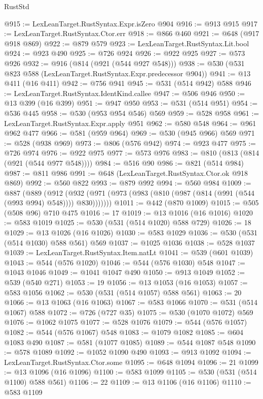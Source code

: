 \begin{lexlean}{RustStd}
\begin{coremodule}
{\begin{coremodule}
{{{{{{{{{{{{{{@915 := LexLeanTarget.RustSyntax.Expr.isZero @904
@916 := @913 @915
@917 := LexLeanTarget.RustSyntax.Ctor.err
@918 := @866 @460
@921 := @648 (@917 @918 @869)
@922 := @879 @579
@923 := LexLeanTarget.RustSyntax.Lit.bool
@924 := @923 @490
@925 := @726 @924
@926 := @922 @925
@927 := @573 @926
@932 := @916 (@814 (@921 (@544 @927 @548)))
@938 := @530 (@531 @823 @588 (LexLeanTarget.RustSyntax.Expr.predecessor @904))
@941 := @13 @411 (@16 @411)
@942 := @756 @941
@945 := @531 (@514 @942) @588
@946 := LexLeanTarget.RustSyntax.IdentKind.callee
@947 := @506 @946
@950 := @13 @399 (@16 @399)
@951 := @947 @950
@953 := @531 (@514 @951)
@954 := @536 @445
@958 := @530 (@953 @954 @546) @569
@959 := @528 @958
@961 := LexLeanTarget.RustSyntax.Expr.apply @951
@962 := @580 @548
@964 := @961 @962 @477
@966 := @581 (@959 @964)
@969 := @530 (@945 @966) @569
@971 := @528 (@938 @969)
@973 := @806 (@576 @942)
@974 := @923 @477
@975 := @726 @974
@976 := @922 @975
@977 := @573 @976
@983 := @810 (@813 (@814 (@921 (@544 @977 @548))))
@984 := @516 @90
@986 := @821 (@514 @984)
@987 := @811 @986
@991 := @648 (LexLeanTarget.RustSyntax.Ctor.ok @918 @869)
@992 := @560 @822
@993 := @879 @992
@994 := @560 @984
@1009 := @887
    (@889
      (@912 (@932 (@971 (@973 (@983 (@810 (@987 (@814 (@991 (@544 (@993 @994) @548)))) @830)))))))
@1011 := @442 (@870 @1009)
@1015 := @505 (@508 @96) @710 @475
@1016 := 17
@1019 := @13 @1016 (@16 @1016)
@1020 := @583 @1019
@1025 := @530 (@531 (@514 @1020) @588 @729)
@1026 := 18
@1029 := @13 @1026 (@16 @1026)
@1030 := @583 @1029
@1036 := @530 (@531 (@514 @1030) @588 @561) @569
@1037 := @1025 @1036
@1038 := @528 @1037
@1039 := LexLeanTarget.RustSyntax.Item.natLt
@1041 := @539 (@601 @1039)
@1043 := @544 (@576 @1020)
@1046 := @544 (@576 @1030) @548
@1047 := @1043 @1046
@1049 := @1041 @1047 @490
@1050 := @913 @1049
@1052 := @539 (@540 @271)
@1053 := 19
@1056 := @13 @1053 (@16 @1053)
@1057 := @583 @1056
@1062 := @530 (@531 (@514 @1057) @588 @561)
@1063 := 20
@1066 := @13 @1063 (@16 @1063)
@1067 := @583 @1066
@1070 := @531 (@514 @1067) @588
@1072 := @726 (@727 @35)
@1075 := @530 (@1070 @1072) @569
@1076 := @1062 @1075
@1077 := @528 @1076
@1079 := @544 (@576 @1057)
@1082 := @544 (@576 @1067) @548
@1083 := @1079 @1082
@1085 := @604 @1083 @490
@1087 := @581 (@1077 @1085)
@1089 := @544 @1087 @548
@1090 := @578 @1089
@1092 := @1052 @1090 @490
@1093 := @913 @1092
@1094 := LexLeanTarget.RustSyntax.Ctor.some
@1095 := @648 @1094
@1096 := 21
@1099 := @13 @1096 (@16 @1096)
@1100 := @583 @1099
@1105 := @530 (@531 (@514 @1100) @588 @561)
@1106 := 22
@1109 := @13 @1106 (@16 @1106)
@1110 := @583 @1109
}}}}}}}}}}}}}}
\end{coremodule}}
\end{coremodule}
\end{lexlean}
